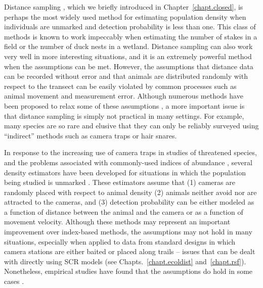 Distance sampling \citep{buckland_etal:2001,buckland_etal:2004book}, which we briefly
introduced in Chapter~\ref{chapt.closed},
is perhaps the most widely used method for
estimating population density when individuals are unmarked and
detection probability is less than one. This class of methods is known
to work impeccably when estimating the number of stakes in a field or
the number of duck nests in a wetland. Distance sampling can also work very well in
more interesting situations, and it is an extremely powerful method when
the assumptions can be met. However, the assumptions that distance
data can be recorded without error and that animals are distributed
randomly with respect to the transect can be easily violated by
common processes such as animal movement and measurement
error. Although numerous methods have been proposed to
relax some of these assumptions
\citet{royle_etal:2004, borchers_etal:1998, johnson_etal:2010,
  marques_etal:2010, chandler_etal:2011},
a more important issue is that distance
sampling is simply not practical in many settings. For example, many
species are so rare and elusive that they can only be reliably
surveyed using ``indirect'' methods such as camera traps or hair
snares.

In response to the increasing use of camera traps in studies of
threatened species, and the problems associated with commonly-used
indices of abundance %
\citep{jennelle_etal:2002,obrien:2011,sollmann_etal:2013bioc},
several density estimators
have been developed for situations in which the population being
studied is unmarked \citet{rowcliffe_etal:2008,rowcliffe_etal:2011}.
These estimators assume that (1) cameras are randomly placed with
respect to animal density (2) animals neither avoid nor are attracted
to the cameras, and (3) detection probability can be either modeled as a function of
distance between the animal and the camera or as a function of
movement velocity. Although these methods may
represent an important improvement over index-based methods,
the assumptions may not hold in many situations, especially when
applied to data from standard designs in which camera stations are
either baited or placed along trails -- issues that can be dealt with
directly using SCR models (see Chapts.~\ref{chapt.ecoldist} and~\ref{chapt.rsf}).
Nonetheless, empirical studies
have found that the assumptions do hold in some cases
\citep{rowcliffe_etal:2008}.

